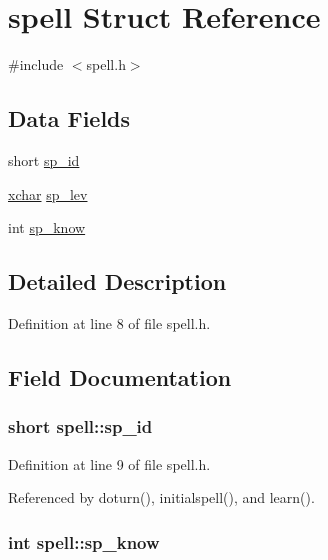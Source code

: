 \hypertarget{structspell}{\section{spell Struct Reference}
\label{structspell}
}


{\ttfamily \#include $<$spell.\+h$>$}

\subsection*{Data Fields}
\begin{DoxyCompactItemize}
\item 
short \hyperlink{structspell_a167ef1854e6555c46ab78ef6a1b67eb1}{sp\+\_\+id}
\item 
\hyperlink{global_8h_a2043b7d01ce89f4ee2fa6c345a752d32}{xchar} \hyperlink{structspell_af40252a9f2b05db46954175fddc67ee3}{sp\+\_\+lev}
\item 
int \hyperlink{structspell_a2d43092ed14b43fb5813ef7ea36bd59c}{sp\+\_\+know}
\end{DoxyCompactItemize}


\subsection{Detailed Description}


Definition at line 8 of file spell.\+h.



\subsection{Field Documentation}
\hypertarget{structspell_a167ef1854e6555c46ab78ef6a1b67eb1}{
\subsubsection[{sp\+\_\+id}]{\setlength{\rightskip}{0pt plus 5cm}short spell\+::sp\+\_\+id}}\label{structspell_a167ef1854e6555c46ab78ef6a1b67eb1}


Definition at line 9 of file spell.\+h.



Referenced by doturn(), initialspell(), and learn().

\hypertarget{structspell_a2d43092ed14b43fb5813ef7ea36bd59c}{
\subsubsection[{sp\+\_\+know}]{\setlength{\rightskip}{0pt plus 5cm}int spell\+::sp\+\_\+know}}\label{structspell_a2d43092ed14b43fb5813ef7ea36bd59c}


